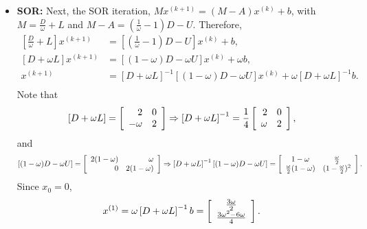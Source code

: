 \begin{questions}
\begin{solution}
\begin{itemize}
\item \textbf{SOR:}
Next, the SOR iteration, $Mx^{(k+1)}=\left(M-A\right)x^{(k)}+b$, with $M=\frac{D}{\omega}+L$ and $M-A=(\frac{1}{\omega}-1)D-U$. Therefore,
\begin{align*}
\left[\frac{D}{\omega}+L\right]x^{(k+1)}&=\left[\left(\frac{1}{\omega}-1\right)D-U\right]x^{(k)}+b,\\
\left[D+\omega L\right]x^{(k+1)}&=\left[\left(1-\omega\right)D-\omega U\right]x^{(k)}+\omega b,\\
x^{(k+1)}&=\left[D+\omega L\right]^{-1}\left[\left(1-\omega\right)D-\omega U\right]x^{(k)}+\omega \left[D+\omega L\right]^{-1}b.\\
\end{align*}
Note that
\begin{align*}
\left[D+\omega L\right]=\left[
	\begin{array}{r r} 
	2 & 0 \\
	-\omega & 2 \\
	\end{array} \right]\Rightarrow \left[D+\omega L\right]^{-1}=\frac{1}{4}\left[
	\begin{array}{r r} 
	2 & 0 \\
	\omega & 2 \\
	\end{array} \right],
\end{align*}
and
\begin{align*}
\left[(1-\omega)D-\omega U\right]=\left[
	\begin{array}{r r} 
	2(1-\omega) & \omega \\
	0 & 2(1-\omega) \\
	\end{array} \right]\Rightarrow \left[D+\omega L\right]^{-1}\left[(1-\omega)D-\omega U\right]=\left[
	\begin{array}{c c} 
	1-\omega & \frac{\omega}{2} \\
	\frac{\omega}{2}(1-\omega) & (1-\frac{\omega}{2})^2\\
	\end{array} \right].
\end{align*}
Since $x_0=0$,
\begin{align*}
x^{(1)}=\omega \left[D+\omega L\right]^{-1}b=\left[
	\begin{array}{c c} 
	\frac{3\omega}{2} \\
	\frac{3\omega^2-6\omega}{4} \\
	\end{array} \right].
\end{align*}

\end{itemize}
\end{solution}
\end{questions}
